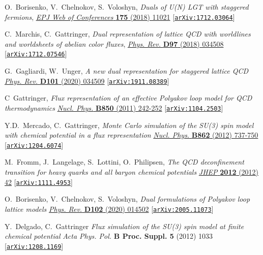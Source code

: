 \documentclass[a4paper,11pt]{article}
\begin{document}
\begin{thebibliography}{99}
O.~Borisenko, V.~Chelnokov, S.~Voloshyn, 
\emph{Duals of U(N) LGT with staggered fermions},
\href{https://doi.org/10.1051/epjconf/201817511021}
{\emph{EPJ Web of Conferences} \textbf{175} (2018) 11021}
[\href{https://arxiv.org/abs/1712.03064}{\tt arXiv:1712.03064}]

C.~Marchis, C.~Gattringer,
\emph{Dual representation of lattice QCD with worldlines and worldsheets of abelian color fluxes},
\href{https://doi.org/10.1103/PhysRevD.97.034508}
{\emph{Phys. Rev.} \textbf{D97} (2018) 034508}
[\href{https://arxiv.org/abs/1712.07546}
{\tt arXiv:1712.07546}]

G.~Gagliardi, W.~Unger,
\emph{A new dual representation for staggered lattice QCD}
\href{https://doi.org/10.1103/PhysRevD.101.034509}
{\emph{Phys. Rev.} \textbf{D101} (2020) 034509}
[\href{https://arxiv.org/abs/1911.08389}
{\tt arXiv:1911.08389}]

C~Gattringer,
\emph{Flux representation of an effective Polyakov loop model for QCD thermodynamics}
\href{https://doi.org/10.1016/j.nuclphysb.2011.04.018}
{\emph{Nucl. Phys.} \textbf{B850} (2011) 242-252}
[\href{https://arxiv.org/abs/1104.2503}
{\tt arXiv:1104.2503}]

Y.D.~Mercado, C.~Gattringer,
\emph{Monte Carlo simulation of the SU(3) spin model with chemical potential in a flux representation}
\href{https://doi.org/10.1016/j.nuclphysb.2012.05.009}
{\emph{Nucl. Phys.} \textbf{B862} (2012) 737-750}
[\href{https://arxiv.org/abs/1204.6074}
{\tt arXiv:1204.6074}]

M.~Fromm, J.~Langelage, S.~Lottini, O.~Philipsen, 
\emph{The QCD deconfinement transition for heavy quarks and all baryon chemical potentials}
\href{https://doi.org/10.1007/JHEP01(2012)042}
{\emph{JHEP} \textbf{2012} (2012) 42}
[\href{https://arxiv.org/abs/1111.4953}
{\tt arXiv:1111.4953}]

O.~Borisenko, V.~Chelnokov, S.~Voloshyn,
\emph{Dual formulations of Polyakov loop lattice models
}
\href{https://doi.org/10.1103/PhysRevD.102.014502}
{\emph{Phys. Rev.} \textbf{D102} (2020) 014502}
[\href{https://arxiv.org/abs/2005.11073}
{\tt arXiv:2005.11073}]

Y.~Delgado, C.~Gattringer
\emph{Flux simulation of the SU(3) spin model at finite chemical potential}
{\emph{Acta Phys. Pol.} \textbf{B Proc. Suppl. 5} (2012) 1033}
[\href{https://arxiv.org/abs/1208.1169}
{\tt arXiv:1208.1169}]


\end{thebibliography}
\end{document}
